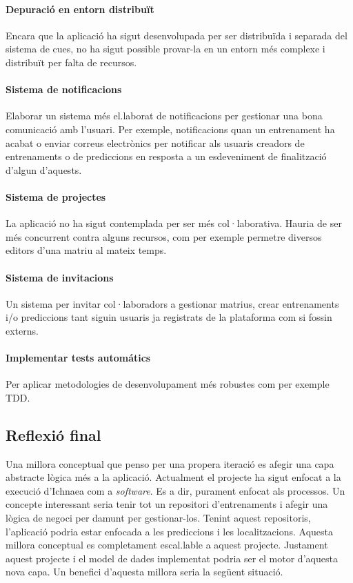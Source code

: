 \paragraph{Depuraci\'{o} en entorn distribuït} Encara que la aplicaci\'{o} ha sigut desenvolupada per ser distribuïda i separada del sistema de cues, no ha sigut possible provar-la en un entorn m\'{e}s complexe i distribuït per falta de recursos.

\paragraph{Sistema de notificacions} Elaborar un sistema m\'{e}s el.laborat de notificacions per gestionar una bona comunicació amb l'usuari. Per exemple, notificacions quan un entrenament ha acabat o enviar correus electrònics per notificar als usuaris creadors de entrenaments o de prediccions en resposta a un esdeveniment de finalitzaci\'{o} d'algun d'aquests. 

\paragraph{Sistema de projectes} La aplicaci\'{o} no ha sigut contemplada per ser m\'{e}s col·laborativa. Hauria de ser m\'{e}s concurrent contra alguns recursos, com per exemple permetre diversos editors d'una matriu al mateix temps.

\paragraph{Sistema de invitacions} Un sistema per invitar col·laboradors a gestionar matrius, crear entrenaments i/o prediccions tant siguin usuaris ja registrats de la plataforma com si fossin externs.

\paragraph{Implementar tests autom\'{a}tics} Per aplicar metodologies de desenvolupament m\'{e}s robustes com per exemple TDD.\cite{tdd}

\subsection{Reflexió final}
Una millora conceptual que penso per una propera iteració es afegir una capa abstracte lògica m\'{e}s a la aplicació. Actualment el projecte ha sigut enfocat a la execució d'Ichnaea com a \textit{software}. Es a dir, purament enfocat als processos. Un concepte interessant seria tenir tot un repositori d'entrenaments i afegir una lògica de negoci per damunt per gestionar-los. Tenint aquest repositoris, l'aplicació podria estar enfocada a les prediccions i les localitzacions. Aquesta millora conceptual es completament escal.lable a aquest projecte. Justament aquest projecte i el model de dades implementat podria ser el motor d'aquesta nova capa. Un benefici d'aquesta millora seria la següent situació.\\

